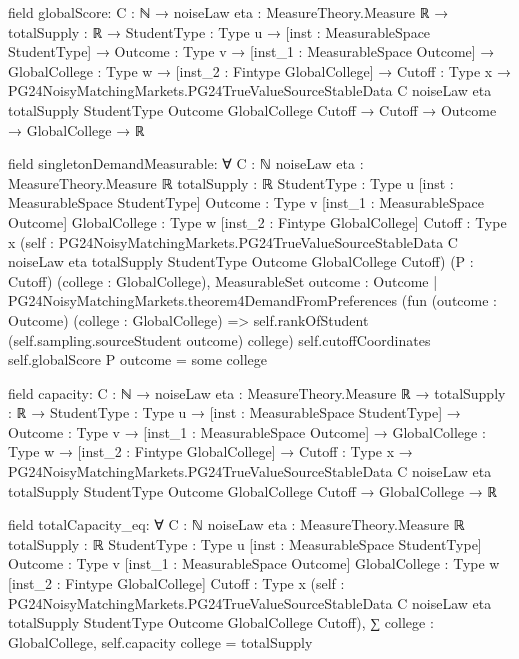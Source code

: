 \documentclass[10pt]{article}
\begin{document}
\begin{ReviewVerbatim}
field globalScore:
{C : ℕ} →
  {noiseLaw eta : MeasureTheory.Measure ℝ} →
    {totalSupply : ℝ} →
      {StudentType : Type u} →
        [inst : MeasurableSpace StudentType] →
          {Outcome : Type v} →
            [inst_1 : MeasurableSpace Outcome] →
              {GlobalCollege : Type w} →
                [inst_2 : Fintype GlobalCollege] →
                  {Cutoff : Type x} →
                    PG24NoisyMatchingMarkets.PG24TrueValueSourceStableData C noiseLaw eta totalSupply StudentType
                        Outcome GlobalCollege Cutoff →
                      Cutoff → Outcome → GlobalCollege → ℝ

field singletonDemandMeasurable:
∀ {C : ℕ} {noiseLaw eta : MeasureTheory.Measure ℝ} {totalSupply : ℝ} {StudentType : Type u}
  [inst : MeasurableSpace StudentType] {Outcome : Type v} [inst_1 : MeasurableSpace Outcome] {GlobalCollege : Type w}
  [inst_2 : Fintype GlobalCollege] {Cutoff : Type x}
  (self :
    PG24NoisyMatchingMarkets.PG24TrueValueSourceStableData C noiseLaw eta totalSupply StudentType Outcome GlobalCollege
      Cutoff)
  (P : Cutoff) (college : GlobalCollege),
  MeasurableSet
    {outcome : Outcome |
      PG24NoisyMatchingMarkets.theorem4DemandFromPreferences
          (fun (outcome : Outcome) (college : GlobalCollege) =>
            self.rankOfStudent (self.sampling.sourceStudent outcome) college)
          self.cutoffCoordinates self.globalScore P outcome =
        some college}

field capacity:
{C : ℕ} →
  {noiseLaw eta : MeasureTheory.Measure ℝ} →
    {totalSupply : ℝ} →
      {StudentType : Type u} →
        [inst : MeasurableSpace StudentType] →
          {Outcome : Type v} →
            [inst_1 : MeasurableSpace Outcome] →
              {GlobalCollege : Type w} →
                [inst_2 : Fintype GlobalCollege] →
                  {Cutoff : Type x} →
                    PG24NoisyMatchingMarkets.PG24TrueValueSourceStableData C noiseLaw eta totalSupply StudentType
                        Outcome GlobalCollege Cutoff →
                      GlobalCollege → ℝ

field totalCapacity_eq:
∀ {C : ℕ} {noiseLaw eta : MeasureTheory.Measure ℝ} {totalSupply : ℝ} {StudentType : Type u}
  [inst : MeasurableSpace StudentType] {Outcome : Type v} [inst_1 : MeasurableSpace Outcome] {GlobalCollege : Type w}
  [inst_2 : Fintype GlobalCollege] {Cutoff : Type x}
  (self :
    PG24NoisyMatchingMarkets.PG24TrueValueSourceStableData C noiseLaw eta totalSupply StudentType Outcome GlobalCollege
      Cutoff),
  ∑ college : GlobalCollege, self.capacity college = totalSupply


\end{ReviewVerbatim}
\end{document}

